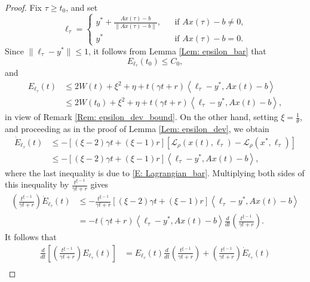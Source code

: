 \documentclass[pdflatex,sn-mathphys-num]{sn-jnl}
\theoremstyle{thmstyleone}
\theoremstyle{thmstyletwo}
\theoremstyle{thmstylethree}
\begin{document}
\begin{proof}
Fix $\tau\ge t_0$, and set
\begin{equation}\label{E: lambda_tau}
\ell_\tau = \left\{
\begin{array}{ccl}
y^* + \frac{Ax(\tau)-b}{\| Ax(\tau)-b \|},& & \text{if }Ax(\tau)-b\neq 0,\\
y^* & & \text{if }Ax(\tau)-b= 0.
\end{array}
\right.
\end{equation}
Since $\|\ell_\tau-y^*\|\le 1$, it follows from Lemma \ref{Lem: epsilon_bar} that 
$$ E_{\ell_\tau}( t_0) \le C_0,$$
and
\begin{equation}\label{E: E_tau_bound}
\begin{aligned}
E_{\ell_\tau}(t) & \le 2W(t) + \xi^2 + \eta + t(\gamma t + r)\left\langle \ell_\tau - y^*, Ax(t)-b \right\rangle \\
 & \le 2W(t_0) + \xi^2 + \eta + t(\gamma t + r)\left\langle \ell_\tau - y^*, Ax(t)-b \right\rangle,    
\end{aligned}
\end{equation}
in view of Remark \ref{Rem: epsilon_dev_bound}. On the other hand, setting $\xi = \frac{1}{\theta}$, and proceeding as in the proof of Lemma \ref{Lem: epsilon_dev}, we obtain
\begin{align*}
\dot E_{\ell_\tau}(t)  
&\le -[ (\xi-2)\gamma t + (\xi-1)r ] \left[ \mathcal{L}_\rho\left(x(t),\ell_\tau\right) - \mathcal{L}_\rho(x^*,\ell_\tau) \right] \\
&\le -[ (\xi-2)\gamma t + (\xi-1)r ] \left\langle \ell_\tau - y^*, Ax(t)-b \right\rangle,
\end{align*}
where the last inequality is due to \eqref{E: Lagrangian_bar}. Multiplying both sides of this inequality by $\frac{t^{\xi-1}}{\gamma t+r}$ gives
\begin{align*}
\left(\tfrac{t^{\xi-1}}{\gamma t+r}\right)\dot E_{\ell_\tau}(t) 
& \le -\tfrac{t^{\xi-1}}{\gamma t+r}[ (\xi-2)\gamma t + (\xi-1)r ] \left\langle \ell_\tau - y^*, Ax(t)-b \right\rangle \\
& = -t(\gamma t+r) \left\langle \ell_\tau - y^*, Ax(t)-b \right\rangle \frac{d}{dt}\left(\tfrac{t^{\xi-1}}{\gamma t+r}\right).
\end{align*}
It follows that
\begin{align*}
\frac{d}{dt}\left[\left(\tfrac{t^{\xi-1}}{\gamma t+r}\right)E_{\ell_\tau}(t)\right] 
&= E_{\ell_\tau}(t)\frac{d}{dt}\left(\tfrac{t^{\xi-1}}{\gamma t+r}\right) + \left(\tfrac{t^{\xi-1}}{\gamma t+r}\right)\dot E_{\ell_\tau}(t)  \\

\end{align*}
\end{proof}
\end{document}
